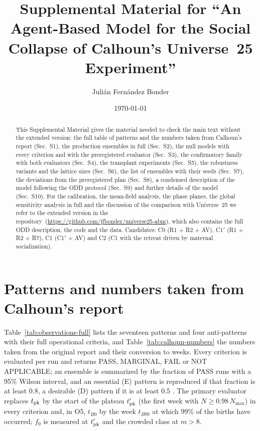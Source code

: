 \documentclass[pre,onecolumn,superscriptaddress,notitlepage]{revtex4-2}
\providecommand{\extended}{the extended version in the repository}
\newcommand{\repourl}{\url{https://github.com/jfbonder/universe25-abm}}
\begin{document}
\title{Supplemental Material for ``An Agent-Based Model for the Social Collapse of Calhoun's Universe~25 Experiment''}

\author{Julián Fernández Bonder}

\date{\today}

\begin{abstract}
This Supplemental Material gives the material needed to check the main text without the extended version: the full table of patterns and the numbers taken from Calhoun's report (Sec.~S1), the production
ensembles in full (Sec.~S2), the null models with every criterion and with the preregistered evaluator (Sec.~S3), the
confirmatory family with both evaluators (Sec.~S4), the transplant experiments (Sec.~S5), the robustness variants
and the lattice sizes (Sec.~S6), the list of ensembles with their seeds (Sec.~S7), the deviations from the
preregistered plan (Sec.~S8), a condensed description of the model following the ODD protocol (Sec.~S9) and
further details of the model (Sec.~S10). For the calibration, the mean-field analysis, the phase planes, the
global sensitivity analysis in full and the discussion of the comparison with Universe~25 we refer to
\extended\ (\repourl), which also contains the full ODD description, the code and the data. Candidates: \textsf{C0} (R1 + R2 + AV), \textsf{C1}$'$ (R1 + R2 + R7),
\textsf{C1} (\textsf{C1}$'$ + AV) and \textsf{C2} (\textsf{C1} with the retreat driven by maternal socialization).
\end{abstract}

\maketitle

\section{Patterns and numbers taken from Calhoun's report}
\label{supp:patterns}

Table~\ref{tab:observations-full} lists the seventeen patterns and four anti-patterns with their full operational
criteria, and Table~\ref{tab:calhoun-numbers} the numbers taken from the original report \cite{Calhoun1973} and
their conversion to weeks. Every criterion is evaluated per run and returns PASS, MARGINAL, FAIL or NOT APPLICABLE;
an ensemble is summarized by the fraction of PASS runs with a 95\% Wilson interval, and an essential (E) pattern is
reproduced if that fraction is at least 0.8, a desirable (D) pattern if it is at least 0.5
\cite{Grimm2005}. The primary evaluator replaces $t_{\rm pk}$ by the start of the plateau $t'_{\rm pk}$ (the first
week with $N\ge0.98\,N_{\max}$) in every criterion and, in O5, $t_{B0}$ by the week $t_{B99}$ at which 99\% of the
births have occurred; $f_0$ is measured at $t'_{\rm pk}$ and the crowded class at $m>8$.
\end{document}
